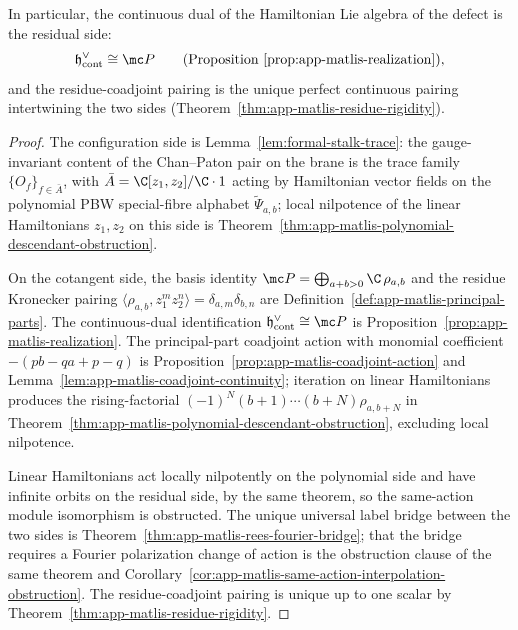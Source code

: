 \begin{thm}
  In particular, the continuous dual of the Hamiltonian Lie algebra of
  the defect is the residual side:
  \[
    \mathfrak h^\vee_{\mathrm{cont}}\cong\mc P
    \qquad\text{(Proposition~\ref{prop:app-matlis-realization})},
  \]
  and the residue-coadjoint pairing is the unique perfect continuous
  pairing intertwining the two sides
  (Theorem~\ref{thm:app-matlis-residue-rigidity}).
\end{thm}

\begin{proof}
  The configuration side is
  Lemma~\ref{lem:formal-stalk-trace}: the gauge-invariant content of
  the Chan--Paton pair on the brane is the trace family
  \(\{O_f\}_{f\in\bar A}\), with \(\bar A=\C[z_1,z_2]/\C\cdot1\) acting
  by Hamiltonian vector fields on the polynomial PBW special-fibre
  alphabet \(\widetilde\Psi_{a,b}\); local nilpotence of the linear
  Hamiltonians \(z_1,z_2\) on this side is
  Theorem~\ref{thm:app-matlis-polynomial-descendant-obstruction}.

  On the cotangent side, the basis identity
  \(\mc P=\bigoplus_{a+b>0}\C\,\rho_{a,b}\) and the residue Kronecker
  pairing
  \(\langle\rho_{a,b},z_1^m z_2^n\rangle=\delta_{a,m}\delta_{b,n}\) are
  Definition~\ref{def:app-matlis-principal-parts}.  The continuous-dual
  identification \(\mathfrak h^\vee_{\mathrm{cont}}\cong\mc P\) is
  Proposition~\ref{prop:app-matlis-realization}.  The principal-part
  coadjoint action with monomial coefficient \(-(pb-qa+p-q)\) is
  Proposition~\ref{prop:app-matlis-coadjoint-action} and
  Lemma~\ref{lem:app-matlis-coadjoint-continuity}; iteration on linear
  Hamiltonians produces the rising-factorial
  \((-1)^N(b+1)\cdots(b+N)\rho_{a,b+N}\) in
  Theorem~\ref{thm:app-matlis-polynomial-descendant-obstruction},
  excluding local nilpotence.

  Linear Hamiltonians act locally nilpotently on the polynomial side and
  have infinite orbits on the residual side, by the same theorem, so the
  same-action module isomorphism is obstructed.  The unique universal label bridge
  between the two sides is Theorem~\ref{thm:app-matlis-rees-fourier-bridge};
  that the bridge requires a Fourier polarization change of action is
  the obstruction clause of the same theorem and
  Corollary~\ref{cor:app-matlis-same-action-interpolation-obstruction}.
  The residue-coadjoint pairing is unique up to one scalar by
  Theorem~\ref{thm:app-matlis-residue-rigidity}.
\end{proof}

